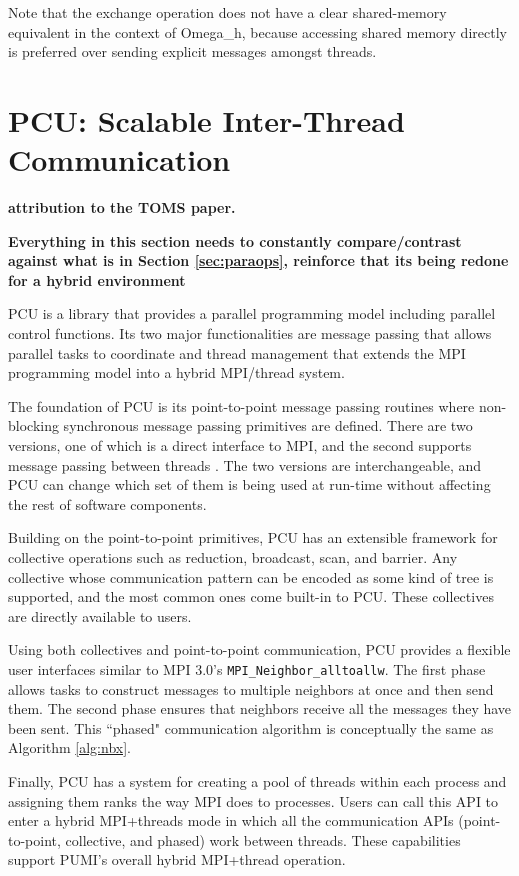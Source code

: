 Note that the exchange operation does not have a clear shared-memory equivalent
in the context of Omega\_h,
because accessing shared memory directly is preferred over sending
explicit messages amongst threads.

\section{PCU: Scalable Inter-Thread Communication}
\label{sec:pcu}

{\bf attribution to the TOMS paper.}

{\bf Everything in this section needs to constantly
compare/contrast against what is in Section \ref{sec:paraops},
reinforce that its being redone for a hybrid environment}

PCU is a library that provides a parallel programming model including
parallel control functions.
Its two major functionalities are message passing that allows parallel tasks to
coordinate and thread management that extends the MPI programming model
into a hybrid MPI/thread system.

The foundation of PCU is its point-to-point message passing routines where
non-blocking synchronous message passing primitives are defined. There are
two versions, one of which is a direct interface to MPI, and the second supports
message passing between threads \cite{ibanez2014hybrid}. The two versions
are interchangeable, and PCU can change which set of them is being used at
run-time without affecting the rest of software components.

Building on the point-to-point primitives, PCU has an extensible framework for
collective operations such as reduction, broadcast, scan, and barrier.
Any collective whose communication pattern can be encoded as some kind of tree
is supported, and the most common ones come built-in to PCU.
These collectives are directly available to users.

Using both collectives and point-to-point communication, PCU provides a flexible
user interfaces similar to MPI 3.0's \texttt{MPI\_Neighbor\_alltoallw}.
The first phase
allows tasks to construct messages to multiple neighbors
at once and then send them.
The second phase ensures that neighbors
receive all the messages they have been sent.
This ``phased" communication algorithm is
conceptually the same as Algorithm \ref{alg:nbx}.

Finally, PCU has a system for creating a pool of threads within each process and
assigning them ranks the way MPI does to processes.
Users can call this API to enter a hybrid MPI+threads mode in which all the
communication APIs (point-to-point, collective, and phased) work between
threads.
These capabilities support PUMI's overall hybrid MPI+thread operation.

